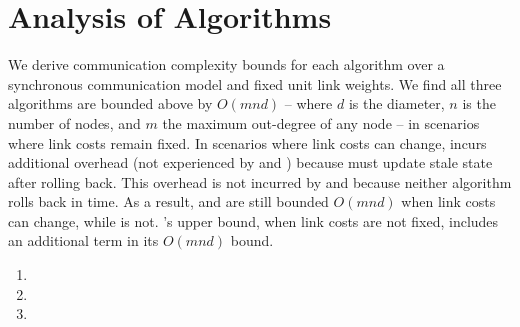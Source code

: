 
\section{Analysis of Algorithms}
\label{sec:analysis}


We derive communication complexity bounds for each algorithm over a synchronous communication model and fixed unit link weights. 
We find all three algorithms are bounded above by $O(mnd)$ -- where $d$ is the diameter, $n$ is the number of nodes, and $m$ the maximum out-degree of any node -- in scenarios where 
link costs remain fixed.  In scenarios where link costs can change, \cpr incurs additional overhead (not experienced by \second and \purges) because \cpr must update stale
state after rolling back.  This overhead is not incurred by \second and \purge because neither algorithm rolls back in time.  As a result, \second and \purge are still bounded
$O(mnd)$ when link costs can change, while \cpr is not. \cprs's upper bound, when link costs are not fixed, includes an additional term in its $O(mnd)$ bound. 

\begin{framed}
\begin{enumerate}
	\item {}

	\item {}

	\item {}

\end{enumerate}

\end{framed}






